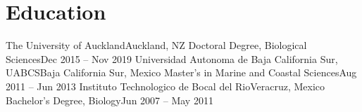 \section{Education}
\resumeSubHeadingList
\resumeSubheading
      {The University of Auckland}{Auckland, NZ}
      {Doctoral Degree, Biological Sciences}{Dec 2015 -- Nov 2019}
\resumeSubheading
      {Universidad Autonoma de Baja California Sur, UABCS}{Baja California Sur, Mexico}
      {Master's in Marine and Coastal Sciences}{Aug 2011 -- Jun 2013}
\resumeSubheading
      {Instituto Technologico de Bocal del Rio}{Veracruz, Mexico}
      {Bachelor's Degree, Biology}{Jun 2007 -- May 2011}
\resumeSubHeadingListEnd